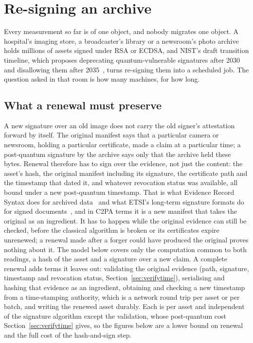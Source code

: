 \section{Re-signing an archive}
\label{sec:resign}

Every measurement so far is of one object, and nobody migrates one object. A
hospital's imaging store, a broadcaster's library or a newsroom's photo
archive holds millions of assets signed under RSA or ECDSA, and NIST's draft
transition timeline, which proposes deprecating quantum-vulnerable signatures
after 2030 and disallowing them after 2035~\cite{nist_ir8547}, turns
re-signing them into a scheduled job. The question asked in that room is how
many machines, for how long.

\subsection{What a renewal must preserve}
\label{sec:renewal}

A new signature over an old image does not carry the old signer's
attestation forward by itself. The original manifest says that a particular
camera or newsroom, holding a particular certificate, made a claim at a
particular time; a post-quantum signature by the archive says only that the
archive held these bytes. Renewal therefore has to sign over the evidence, not
just the content: the asset's hash, the original manifest including its
signature, the certificate path and the timestamp that dated it, and whatever
revocation status was available, all bound under a new post-quantum timestamp.
That is what Evidence Record Syntax does for archived data~\cite{rfc4998} and
what ETSI's long-term signature formats do for signed
documents~\cite{etsi319102}, and in C2PA terms it is a new manifest that takes
the original as an ingredient. It has to happen while the original evidence
can still be checked, before the classical algorithm is broken or its
certificates expire unrenewed; a renewal made after a forger could have
produced the original proves nothing about it. The model below covers only the computation common to both readings, a hash of the asset and a signature over a new claim. A complete renewal adds terms it leaves out: validating the original evidence (path, signature, timestamp and revocation status, Section~\ref{sec:verifytime}), serialising and hashing that evidence as an ingredient, obtaining and checking a new timestamp from a time-stamping authority, which is a network round trip per asset or per batch, and writing the renewed asset durably. Each is per asset and independent of the signature algorithm except the validation, whose post-quantum cost Section~\ref{sec:verifytime} gives, so the figures below are a lower bound on renewal and the full cost of the hash-and-sign step.


